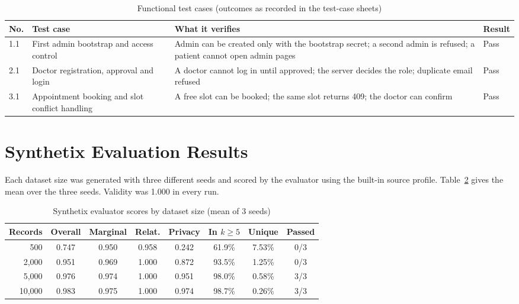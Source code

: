 \documentclass{tietreport}
\begin{document}
\begin{table}[H]
\centering
\small
\begin{tabular}{p{1.0cm}p{4.2cm}p{5.6cm}p{1.6cm}}
\toprule
\textbf{No.} & \textbf{Test case} & \textbf{What it verifies} & \textbf{Result} \\
\midrule
1.1 & First admin bootstrap and access control & Admin can be created only with the bootstrap secret; a second admin is refused; a patient cannot open admin pages & Pass \\
2.1 & Doctor registration, approval and login & A doctor cannot log in until approved; the server decides the role; duplicate email refused & Pass \\
3.1 & Appointment booking and slot conflict handling & A free slot can be booked; the same slot returns 409; the doctor can confirm & Pass \\
\bottomrule
\end{tabular}
\caption{Functional test cases (outcomes as recorded in the test-case sheets)}
\label{tab:tc}
\end{table}

\section{Synthetix Evaluation Results}
\label{sec:synres}

Each dataset size was generated with three different seeds and scored by the
evaluator using the built-in source profile. Table~\ref{tab:engine} gives the
mean over the three seeds. Validity was 1.000 in every run.

\begin{table}[H]
\centering
\small
\begin{tabular}{rccccccc}
\toprule
\textbf{Records} & \textbf{Overall} & \textbf{Marginal} & \textbf{Relat.} & \textbf{Privacy} & \textbf{In $k\!\ge\!5$} & \textbf{Unique} & \textbf{Passed} \\
\midrule
500 & 0.747 & 0.950 & 0.958 & 0.242 & 61.9\% & 7.53\% & 0/3 \\
2{,}000 & 0.951 & 0.969 & 1.000 & 0.872 & 93.5\% & 1.25\% & 0/3 \\
5{,}000 & 0.976 & 0.974 & 1.000 & 0.951 & 98.0\% & 0.58\% & 3/3 \\
10{,}000 & 0.983 & 0.975 & 1.000 & 0.974 & 98.7\% & 0.26\% & 3/3 \\
\bottomrule
\end{tabular}
\caption{Synthetix evaluator scores by dataset size (mean of 3 seeds)}
\label{tab:engine}
\end{table}
\end{document}
